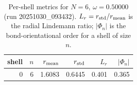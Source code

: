\begin{table}[t]
\centering
\small
\setlength{\tabcolsep}{4pt}
\renewcommand{\arraystretch}{1.15}
\begin{tabular}{r r r r r r}
\toprule
shell & $n$ & $r_{\rm mean}$ & $r_{\rm std}$ & $L_r$ & $|\Phi_n|$ \\
\midrule
0 & 6 & 1.6083 & 0.6445 & 0.401 & 0.365 \\
\bottomrule
\end{tabular}
\caption{Per-shell metrics for $N=6$, $\omega=0.50000$ (run 20251030_093432). $L_r=r_{\rm std}/r_{\rm mean}$ is the radial Lindemann ratio; $|\Phi_n|$ is the bond-orientational order for a shell of size $n$.}
\end{table}